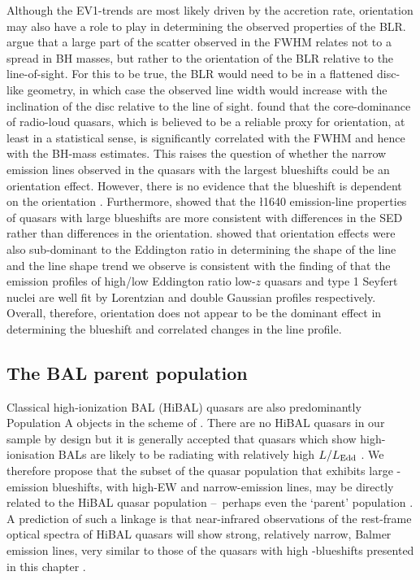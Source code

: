 Although the EV1-trends \citep{sulentic00b,shen14} are most likely driven by the accretion rate, orientation may also have a role to play in determining the observed properties of the BLR. 
\citet{shen14} argue that a large part of the scatter observed in the \hb FWHM relates not to a spread in BH masses, but rather to the orientation of the BLR relative to the line-of-sight.
For this to be true, the BLR would need to be in a flattened disc-like geometry, in which case the observed line width would increase with the inclination of the disc relative to the line of sight. 
\citet{brotherton15b} found that the core-dominance of radio-loud quasars, which is believed to be a reliable proxy for orientation, at least in a statistical sense, is significantly correlated with the \hb FWHM and hence with the BH-mass estimates. 
This raises the question of whether the narrow \ha emission lines observed in the quasars with the largest  blueshifts could be an orientation effect. 
However, there is no evidence that the  blueshift is dependent on the orientation \citep[inferred from the radio core-dominance;][]{richards11,runnoe14}. 
Furthermore, \citet{leighly04} showed that the \l1640 emission-line properties of quasars with large  blueshifts are more consistent with differences in the SED rather than differences in the orientation.
\citet{collin06} showed that orientation effects were also sub-dominant to the Eddington ratio in determining the shape of the \hb line and
the \ha line shape trend we observe is consistent with the finding of \citet{marziani03} that the \hb emission profiles of high/low Eddington ratio low-$z$ quasars and type 1 Seyfert nuclei are well fit by Lorentzian and double Gaussian profiles respectively.  
Overall, therefore, orientation does not appear to be the dominant effect in determining the  blueshift and correlated changes in the \ha line profile. 

\subsection{The BAL parent population}

Classical high-ionization BAL (HiBAL) quasars are also predominantly Population A objects in the scheme of \citet{sulentic00b}. 
There are no HiBAL quasars in our sample by design but it is generally accepted that quasars which show high-ionisation BALs are likely to be radiating with relatively high $L/L_{\rm Edd}$ \citep[e.g.][]{zhang14}. 
We therefore propose that the subset of the quasar population that exhibits large -emission blueshifts, with high-EW and narrow-\ha emission lines, may be directly related to the HiBAL quasar population \---\ perhaps even the `parent' population \citep{richards06conf}. 
A prediction of such a linkage is that near-infrared observations of the rest-frame optical spectra of HiBAL quasars will show strong, relatively narrow, Balmer emission lines, very similar to those of the quasars with high -blueshifts presented in this chapter \citep[see][for such a study]{runnoe13b}. 

